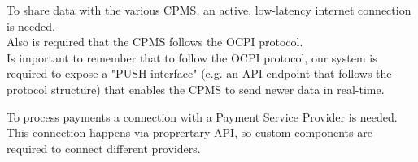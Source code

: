 \begin{enumerate}
	To share data with the various CPMS, an active, low-latency internet connection is needed.\\
   Also is required that the CPMS follows the OCPI protocol.\\
   Is important to remember that to follow the OCPI protocol, our system is required to expose a "PUSH interface" (e.g. an API endpoint that follows the protocol structure) that enables the CPMS to send newer data in real-time.
   
    To process payments a connection with a Payment Service Provider is needed. This connection happens via proprertary API, so custom components are required to connect different providers.
\end{enumerate}


























